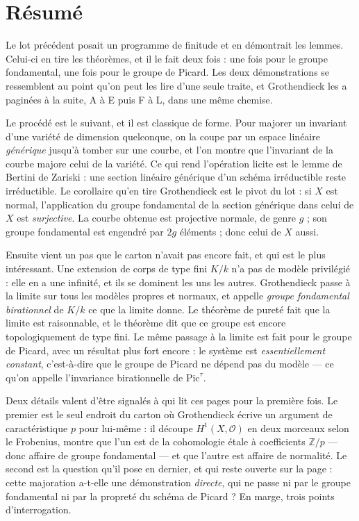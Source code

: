 \documentclass[11pt,a4paper]{article}
\begin{document}
\section*{Résumé}

\begin{resume}
Le lot précédent posait un programme de finitude et en démontrait les lemmes.
Celui-ci en tire les théorèmes, et il le fait deux fois : une fois pour le
groupe fondamental, une fois pour le groupe de Picard. Les deux démonstrations
se ressemblent au point qu'on peut les lire d'une seule traite, et
Grothendieck les a paginées à la suite, A à E puis F à L, dans une même
chemise.

Le procédé est le suivant, et il est classique de forme. Pour majorer un
invariant d'une variété de dimension quelconque, on la coupe par un espace
linéaire \emph{générique} jusqu'à tomber sur une courbe, et l'on montre que
l'invariant de la courbe majore celui de la variété. Ce qui rend l'opération
licite est le lemme de Bertini de Zariski : une section linéaire générique
d'un schéma irréductible reste irréductible. Le corollaire qu'en tire
Grothendieck est le pivot du lot : si $X$ est normal, l'application du groupe
fondamental de la section générique dans celui de $X$ est \emph{surjective}.
La courbe obtenue est projective normale, de genre $g$ ; son groupe fondamental
est engendré par $2g$ éléments ; donc celui de $X$ aussi.

Ensuite vient un pas que le carton n'avait pas encore fait, et qui est le
plus intéressant. Une extension de corps de type fini $K/k$ n'a pas de modèle
privilégié : elle en a une infinité, et ils se dominent les uns les autres.
Grothendieck passe à la limite sur tous les modèles propres et normaux, et
appelle \emph{groupe fondamental birationnel} de $K/k$ ce que la limite donne.
Le théorème de pureté fait que la limite est raisonnable, et le théorème dit
que ce groupe est encore topologiquement de type fini. Le même passage à la
limite est fait pour le groupe de Picard, avec un résultat plus fort encore :
le système est \emph{essentiellement constant}, c'est-à-dire que le groupe de
Picard ne dépend pas du modèle --- ce qu'on appelle l'invariance birationnelle
de $\mathrm{Pic}^{\tau}$.

Deux détails valent d'être signalés à qui lit ces pages pour la première fois.
Le premier est le seul endroit du carton où Grothendieck écrive un argument de
caractéristique $p$ pour lui-même : il découpe $H^{1}(X, \mathcal{O})$ en deux
morceaux selon le Frobenius, montre que l'un est de la cohomologie étale à
coefficients $\mathbb{Z}/p$ --- donc affaire de groupe fondamental --- et que
l'autre est affaire de normalité. Le second est la question qu'il pose en
dernier, et qui reste ouverte sur la page : cette majoration
a-t-elle une démonstration \emph{directe}, qui ne passe ni par le groupe
fondamental ni par la propreté du schéma de Picard ? En marge, trois points
d'interrogation.


\end{resume}
\end{document}
